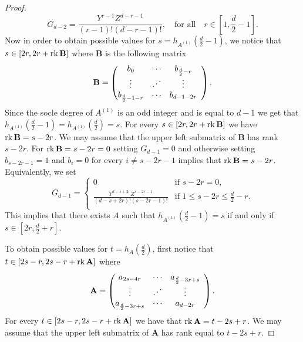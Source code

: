 \documentclass[12pt]{amsart}
\numberwithin{equation}{section}
\theoremstyle{plain} \newtheorem{theorem}{Theorem}[section]
\theoremstyle{definition} \newtheorem{definition}[theorem]{Definition}
\begin{document}
\begin{proof}
\begin{equation}\label{G_(d-2)even(1)}
G_{d-2}= \frac{Y^{r-1}Z^{d-r-1}}{(r-1)!(d-r-1)!}, \quad \text{for all}\quad r\in[1,\frac{d}{2}-1].
\end{equation}
Now in order to obtain possible values for $s=h_{A^{(1)}}(\frac{d}{2}-1)$, we notice that $s\in [2r, 2r+\operatorname{rk} \mathbf{B}]$ where $\mathbf{B}$ is the following matrix 
$$
\mathbf{B}=\left(\begin{array}{@{}ccccccc@{}}
 b_{0} &\cdots & b_{\frac{d}{2}-r} \\
    \vdots  & \reflectbox{$\ddots$} &\vdots\\
b_{\frac{d}{2}-1-r}&\cdots & b_{d-1-2r}      \end{array}\right).
$$
Since the socle degree of $A^{(1)}$ is an odd integer and is equal to $d-1$ we get that $ h_{A^{(1)}}(\frac{d}{2}-1)= h_{A^{(1)}}(\frac{d}{2}) = s$. For every $s\in [2r, 2r+\operatorname{rk}\mathbf{B}]$ we have $\operatorname{rk}\mathbf{B}=s-2r$. We may assume that the upper left submatrix of $\mathbf{B}$ has rank $s-2r$. For $\operatorname{rk}\mathbf{B}=s-2r=0$ setting $G_{d-1}=0$ and otherwise setting $b_{s-2r-1}=1$ and $b_i=0$ for every $i\neq s-2r-1$ implies that $\operatorname{rk}\mathbf{B}=s-2r$.  Equivalently, we set 
\begin{equation}\label{G_(d-1)even(1)}
G_{d-1}=\left\{
                \begin{array}{ll}
                  0 & \text{if $s-2r=0$},\\
                  \frac{Y^{d-s+2r}Z^{s-2r-1}}{(d-s+2r)!(s-2r-1)!} & \text{if $1\leq s-2r\leq \frac{d}{2}-r.$}\\
                \end{array}
              \right.
\end{equation}
This implies that there exists $A$ such that $h_{A^{(1)}}(\frac{d}{2}-1)=s $ if and only if  $s\in [2r,\frac{d}{2}+r].$\par 
To obtain possible values for $t=h_A(\frac{d}{2})$, first notice that $t\in [2s-r, 2s-r+\operatorname{rk}\mathbf{A}]$ where 
$$
\mathbf{A}=\left(\begin{array}{@{}ccccccc@{}}
 a_{2s-4r} &\cdots & a_{\frac{d}{2}-3r+s} \\
    \vdots  & \reflectbox{$\ddots$} &\vdots\\
a_{\frac{d}{2}-3r+s}&\cdots & a_{d-2r}      \end{array}\right).
$$
For every $t\in [2s-r, 2s-r+\operatorname{rk}\mathbf{A}]$ we have that $\operatorname{rk}\mathbf{A}=t-2s+r$. We may assume that the upper left submatrix of $\mathbf{A}$ has rank equal to $t-2s+r$. 

\end{proof}
\end{document}

